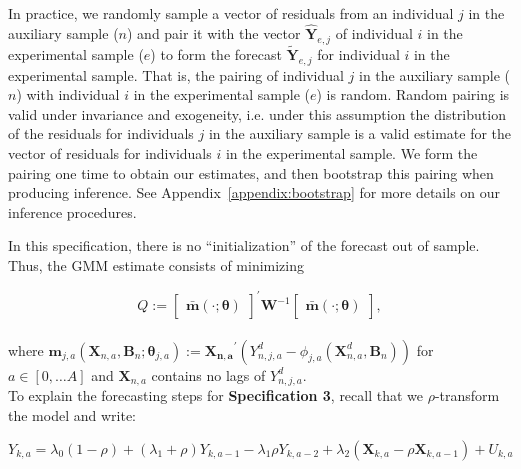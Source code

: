 \begin{enumerate}
\noindent In practice, we randomly sample a vector of residuals from an individual $j$ in the auxiliary sample ($n$) and pair it with the vector $\hat{\bm{Y}}_{e,j}$ of individual $i$ in the experimental sample ($e$) to form the forecast $\tilde{\bm{Y}}_{e,j}$ for individual $i$ in the experimental sample. That is, the pairing of individual $j$ in the auxiliary sample ($n$) with individual $i$ in the experimental sample ($e$) is random. Random pairing is valid under invariance and exogeneity, i.e. under this assumption the distribution of the residuals for individuals $j$ in the auxiliary sample is a valid estimate for the vector of residuals for individuals $i$ in the experimental sample. We form the pairing one time to obtain our estimates, and then bootstrap this pairing when producing inference. See Appendix~\ref{appendix:bootstrap} for more details on our inference procedures.
\end{enumerate}

\noindent In this specification, there is no ``initialization'' of the forecast out of sample. Thus, the GMM estimate consists of minimizing

\begin{equation}
Q :=  {\begin{bmatrix} {\bm{\bar{m}} \left( \cdot ; \bm{\theta} \right) }  \end{bmatrix}}^{'}
\bm{W} ^{-1}{\begin{bmatrix} {\bm{\bar{m}} \left( \cdot ; \bm{\theta} \right) }   \end{bmatrix}}, \label{eq:wlossspec2}
\end{equation}\\

\noindent where $\bm{m}_{j,a} \left( \bm{X}_{n,a}, \bm{B}_{n} ; \bm{\theta}_{j,a} \right) := {\bm{X_{n,a}}}^{'} \left( Y_{n,j,a}^d -   \phi_{j,a} \left( \bm{X}_{n,a}^d, \bm{B}_{n} \right) \right)$ for $a \in [0, \ldots A]$ and  $\bm{X}_{n,a}$ contains no lags of $Y_{n,j,a}^d$.\\

\noindent  To explain the forecasting steps for \textbf{Specification 3}, recall that we $\rho$-transform the model and write:

\begin{equation}
Y_{k,a} = \lambda_{0} \left( 1 - \rho \right) + \left( \lambda_{1} + \rho \right) Y_{k,a-1} - \lambda_{1} \rho Y_{k,a-2} + \lambda_{2} \left( \bm{X}_{k,a} - \rho \bm{X}_{k,a-1}  \right) + U_{k,a} \label{eq:rhotransform}
\end{equation}

